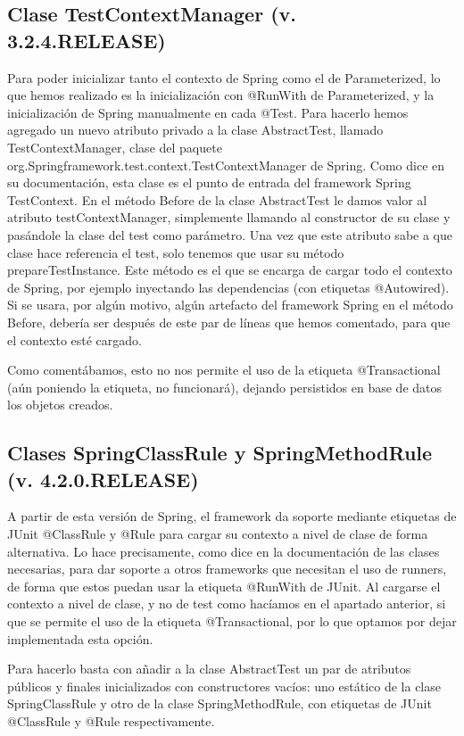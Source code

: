 \documentclass[a4paper]{article}
\begin{document}
\subsection{Clase TestContextManager (v. 3.2.4.RELEASE)}

Para poder inicializar tanto el contexto de Spring como el de Parameterized, lo que hemos realizado es la inicialización con @RunWith de Parameterized, y la inicialización de Spring manualmente en cada @Test. Para hacerlo hemos agregado un nuevo atributo privado a la clase AbstractTest, llamado TestContextManager, clase del paquete org.Springframework.test.context.TestContextManager de Spring. Como dice en su documentación, esta clase es el punto de entrada del framework Spring TestContext. En el método Before de la clase AbstractTest le damos valor al atributo testContextManager, simplemente llamando al constructor de su clase y pasándole la clase del test como parámetro. Una vez que este atributo sabe a que clase hace referencia el test, solo tenemos que usar su método prepareTestInstance. Este método es el que se encarga de cargar todo el contexto de Spring, por ejemplo inyectando las dependencias (con etiquetas @Autowired). Si se usara, por algún motivo, algún artefacto del framework Spring en el método Before, debería ser después de este par de líneas que hemos comentado, para que el contexto esté cargado.

Como comentábamos, esto no nos permite el uso de la etiqueta @Transactional (aún poniendo la etiqueta, no funcionará), dejando persistidos en base de datos los objetos creados. 

\subsection{Clases SpringClassRule y SpringMethodRule \\ (v. 4.2.0.RELEASE)}

A partir de esta versión de Spring, el framework da soporte mediante etiquetas de JUnit @ClassRule y @Rule para cargar su contexto a nivel de clase de forma alternativa. Lo hace precisamente, como dice en la documentación de las clases necesarias, para dar soporte a otros frameworks que necesitan el uso de runners, de forma que estos puedan usar la etiqueta @RunWith de JUnit. Al cargarse el contexto a nivel de clase, y no de test como hacíamos en el apartado anterior, si que se permite el uso de la etiqueta @Transactional, por lo que optamos por dejar implementada esta opción.

Para hacerlo basta con añadir a la clase AbstractTest un par de atributos públicos y finales inicializados con constructores vacíos: uno estático de la clase SpringClassRule y otro de la clase SpringMethodRule, con etiquetas de JUnit @ClassRule y @Rule respectivamente.
\end{document}
